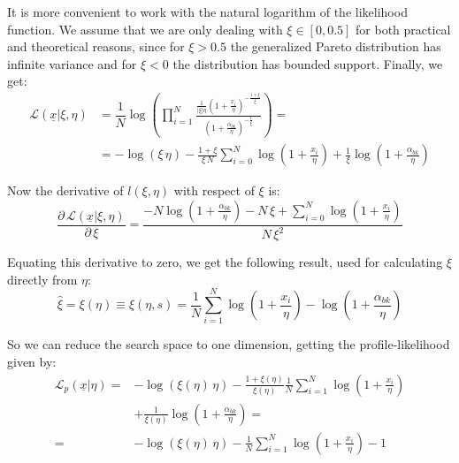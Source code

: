 It is more convenient to work with the natural logarithm of the likelihood function. We assume that we are only dealing with $\xi \in [0,0.5]$ for both practical and theoretical reasons, since for $\xi > 0.5$ the generalized Pareto distribution has infinite variance and for $\xi < 0$ the distribution has bounded support. Finally, we get:
\begin{align}
	\mathcal{L}(\underline{x}| \xi, \eta) &= \dfrac{1}{N} \log \left(
    \prod_{i = 1}^{N} \frac{
      \frac{1}{|\xi| \eta} \left(1 + \frac{x_i}{\eta} \right)^{-\frac{1 +\xi}{\xi}}
    }{
      \left( 1 + \frac{\alpha_{bk}}{\eta} \right)^{-\frac{1}{\xi}}
    } \right) = \nonumber \\
	&=
	  - \log \left( \xi \, \eta \right)
	  - \frac{1 + \xi}{\xi \, N} \sum_{i = 0}^{N} \log \left( 1 + \frac{x_i}{\eta} \right)
	  + \frac{1}{\xi} \log \left( 1 + \frac{\alpha_{bk}}{\eta} \right)
\end{align}

Now the derivative of $l(\xi, \eta)$ with respect of $\xi$ is:
\begin{equation}
	\dfrac{\partial \, \mathcal{L}(\underline{x}| \xi, \eta)}{\partial \, \xi} =
	  \frac{
	    - N \log \left( 1 + \frac{\alpha_{bk}}{\eta} \right)
	    - N \, \xi + \sum_{i = 0}^{N} \log \left( 1 + \frac{x_i}{\eta} \right)
	  }{
	    N \, \xi^2
	  }
\end{equation}

Equating this derivative to zero, we get the following result, used for calculating $\xi$ directly from $\eta$:
\begin{equation}
	\hat{\xi} = \xi (\eta) \equiv \xi (\eta, s) =
	  \frac{1}{N} \sum_{i = 1}^{N} \log \left( 1 + \frac{x_i}{\eta} \right)
	  - \log \left( 1 + \frac{\alpha_{bk}}{\eta} \right)
\end{equation}

So we can reduce the search space to one dimension, getting the profile-likelihood given by:
\begin{align}
	\mathcal{L}_p(\underline{x}|\eta) =&
	    - \log \left(\xi (\eta) \, \eta \right)
	    - \frac{1 + \xi (\eta)}{\xi(\eta)}  \frac{1}{N} \sum_{i = 1}^{N} \log \left( 1 + \frac{x_i}{\eta} \right) \nonumber \\
	    &+ \frac{1}{\xi(\eta)} \log \left( 1 + \frac{\alpha_{bk}}{\eta} \right)
    = \nonumber \\
		=& - \log ( \xi (\eta) \, \eta ) - \frac{1}{N} \sum_{i = 1}^{N} \log \left( 1 + \frac{x_i}{\eta} \right) - 1 \label{eq:prof_like}
\end{align}

